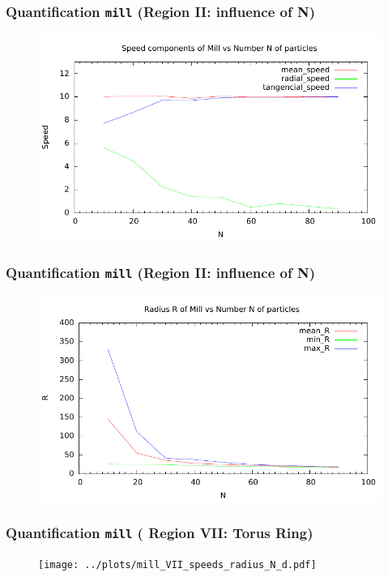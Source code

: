 \documentclass[compress]{beamer}
\begin{document}
\begin{frame}
	\frametitle{Quantification \texttt{mill} \small (Region II: influence of N)} \normalsize
	\begin{figure}[H]
		\includegraphics[width=1. \columnwidth]{../plots/mill_II_speeds_N.pdf}
	\end{figure}	
\end{frame}


\begin{frame}
	\frametitle{Quantification \texttt{mill} \small (Region II: influence of N)} \normalsize
	
\begin{figure}[H]
		\includegraphics[width=1. \columnwidth]{../plots/mill_II_radius_N.pdf}
\end{figure}

\end{frame}


\begin{frame}
	\frametitle{Quantification \texttt{mill} \small ( Region VII: Torus Ring)} \normalsize
	
\begin{figure}[H]
		\texttt{[image: ../plots/mill\_VII\_speeds\_radius\_N\_d.pdf]}
\end{figure}

\end{frame}
\end{document}
